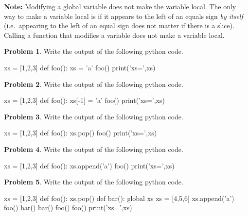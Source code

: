\documentclass[12pt]{article}
\theoremstyle{definition}
\newtheorem{problem}{Problem}
\begin{document}
\newpage
\noindent
\textbf{Note:}
Modifying a global variable does not make the variable local.
The only way to make a variable local is if it appears to the left of an equals sign \emph{by itself}
(i.e.\ appearing to the left of an equal sign does not matter if there is a slice).
Calling a function that modifies a variable does not make a variable local.

\begin{problem}
Write the output of the following python code.
\begin{python}
xs = [1,2,3]
def foo():
    xs = 'a'
foo()
print('xs=',xs)
\end{python}
\end{problem}
\vspace{1in}

\begin{problem}
Write the output of the following python code.
\begin{python}
xs = [1,2,3]
def foo():
    xs[-1] = 'a'
foo()
print('xs=',xs)
\end{python}
\end{problem}
\vspace{1.5in}

\begin{problem}
Write the output of the following python code.
\begin{python}
xs = [1,2,3]
def foo():
    xs.pop()
foo()
print('xs=',xs)
\end{python}
\end{problem}
\vspace{1.5in}

\newpage

\begin{problem}
Write the output of the following python code.
\begin{python}
xs = [1,2,3]
def foo():
    xs.append('a')
foo()
print('xs=',xs)
\end{python}
\end{problem}
\vspace{1.5in}

\begin{problem}
Write the output of the following python code.
\begin{python}
xs = [1,2,3]
def foo():
    xs.pop()
def bar():
    global xs
    xs = [4,5,6]
    xs.append('a')
foo()
bar()
bar()
foo()
foo()
print('xs=',xs)
\end{python}
\end{problem}
\vspace{1.5in}
\end{document}
